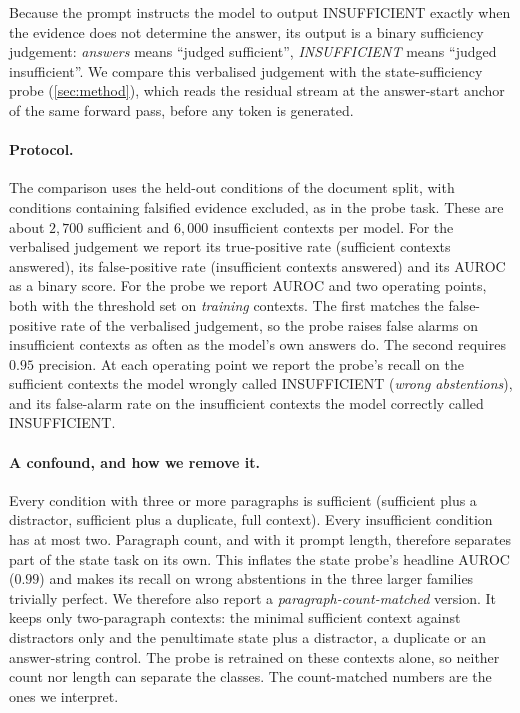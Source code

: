 Because the prompt instructs the model to output INSUFFICIENT exactly when the evidence does not determine the answer, its output is a binary sufficiency judgement: \emph{answers} means ``judged sufficient'', \emph{INSUFFICIENT} means ``judged insufficient''. We compare this verbalised judgement with the state-sufficiency probe (\cref{sec:method}), which reads the residual stream at the answer-start anchor of the same forward pass, before any token is generated.

\paragraph{Protocol.} The comparison uses the held-out conditions of the document split, with conditions containing falsified evidence excluded, as in the probe task. These are about $2{,}700$ sufficient and $6{,}000$ insufficient contexts per model. For the verbalised judgement we report its true-positive rate (sufficient contexts answered), its false-positive rate (insufficient contexts answered) and its AUROC as a binary score. For the probe we report AUROC and two operating points, both with the threshold set on \emph{training} contexts. The first matches the false-positive rate of the verbalised judgement, so the probe raises false alarms on insufficient contexts as often as the model's own answers do. The second requires $0.95$ precision. At each operating point we report the probe's recall on the sufficient contexts the model wrongly called INSUFFICIENT (\emph{wrong abstentions}), and its false-alarm rate on the insufficient contexts the model correctly called INSUFFICIENT.

\paragraph{A confound, and how we remove it.} Every condition with three or more paragraphs is sufficient (sufficient plus a distractor, sufficient plus a duplicate, full context). Every insufficient condition has at most two. Paragraph count, and with it prompt length, therefore separates part of the state task on its own. This inflates the state probe's headline AUROC ($0.99$) and makes its recall on wrong abstentions in the three larger families trivially perfect. We therefore also report a \emph{paragraph-count-matched} version. It keeps only two-paragraph contexts: the minimal sufficient context against distractors only and the penultimate state plus a distractor, a duplicate or an answer-string control. The probe is retrained on these contexts alone, so neither count nor length can separate the classes. The count-matched numbers are the ones we interpret.

